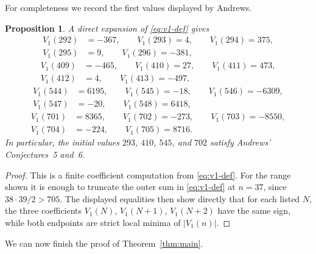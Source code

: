 \documentclass[reqno]{amsart}
\theoremstyle{definition}
\theoremstyle{plain}
\newtheorem{proposition}{Proposition}
\theoremstyle{remark}
\numberwithin{equation}{section}
\begin{document}
For completeness we record the first values displayed by Andrews.

\begin{proposition}\label{prop:initial-values}
A direct expansion of \eqref{eq:v1-def} gives
\[
\begin{aligned}
V_1(292)&=-367,\qquad V_1(293)=4,\qquad V_1(294)=375,\\
V_1(295)&=9,\qquad V_1(296)=-381,
\end{aligned}
\]
\[
\begin{aligned}
V_1(409)&=-465,\qquad V_1(410)=27,\qquad V_1(411)=473,\\
V_1(412)&=4,\qquad V_1(413)=-497,
\end{aligned}
\]
\[
\begin{aligned}
V_1(544)&=6195,\qquad V_1(545)=-18,\qquad V_1(546)=-6309,\\
V_1(547)&=-20,\qquad V_1(548)=6418,
\end{aligned}
\]
\[
\begin{aligned}
V_1(701)&=8365,\qquad V_1(702)=-273,\qquad V_1(703)=-8550,\\
V_1(704)&=-224,\qquad V_1(705)=8716.
\end{aligned}
\]
In particular, the initial values $293$, $410$, $545$, and $702$ satisfy Andrews' Conjectures~5 and~6.
\end{proposition}

\begin{proof}
This is a finite coefficient computation from \eqref{eq:v1-def}. For the range shown it is enough to truncate the outer sum in \eqref{eq:v1-def} at $n=37$, since $38\cdot 39/2>705$. The displayed equalities then show directly that for each listed $N$, the three coefficients $V_1(N)$, $V_1(N+1)$, $V_1(N+2)$ have the same sign, while both endpoints are strict local minima of $|V_1(n)|$.
\end{proof}

We can now finish the proof of Theorem~\ref{thm:main}.
\end{document}

